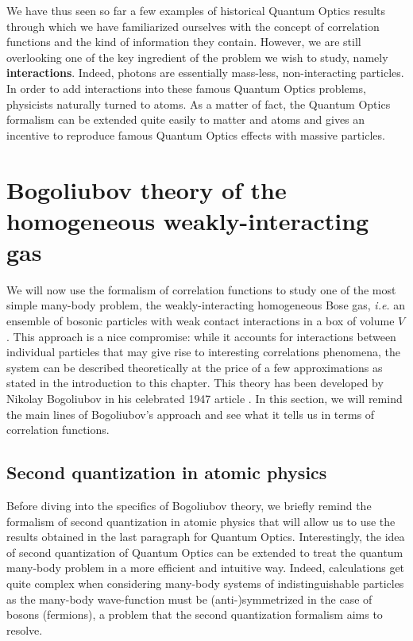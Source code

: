 We have thus seen so far a few examples of historical Quantum Optics results through which we have familiarized ourselves with the concept of correlation functions and the kind of information they contain. However, we are still overlooking one of the key ingredient of the problem we wish to study, namely \textbf{interactions}. Indeed, photons are essentially mass-less, non-interacting particles. In order to add interactions into these famous Quantum Optics problems, physicists naturally turned to atoms. As a matter of fact, the Quantum Optics formalism can be extended quite easily to matter and atoms and gives an incentive to reproduce famous Quantum Optics effects with massive particles.
  

\section{Bogoliubov theory of the homogeneous weakly-interacting gas}

We will now use the formalism of correlation functions to study one of the most simple many-body problem, the weakly-interacting homogeneous Bose gas, {\it i.e.} an ensemble of bosonic particles with weak contact interactions in a box of volume $V$. This approach is a nice compromise: while it accounts for interactions between individual particles that may give rise to interesting correlations phenomena, the system can be described theoretically at the price of a few approximations as stated in the introduction to this chapter. This theory has been developed by Nikolay Bogoliubov in his celebrated 1947 article \cite{bogoliubov1947}. In this section, we will remind the main lines of Bogoliubov's approach and see what it tells us in terms of correlation functions.

\subsection{Second quantization in atomic physics}

Before diving into the specifics of Bogoliubov theory, we briefly remind the formalism of second quantization in atomic physics that will allow us to use the results obtained in the last paragraph for Quantum Optics. Interestingly, the idea of second quantization of Quantum Optics can be extended to treat the quantum many-body problem in a more efficient and intuitive way. Indeed, calculations get quite complex when considering many-body systems of indistinguishable particles as the many-body wave-function must be (anti-)symmetrized in the case of bosons (fermions), a problem that the second quantization formalism aims to resolve.

